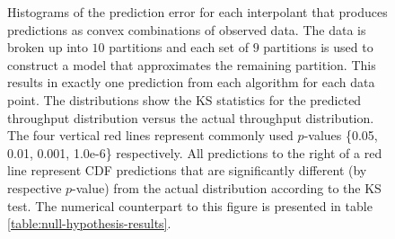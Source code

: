 \documentclass[smallextended,final]{svjour3}       %
\begin{document}
\begin{figure}
  \centering
  \caption{Histograms of the prediction error for each interpolant that produces predictions as convex combinations of observed data. The data is broken up into $10$ partitions and each set of $9$ partitions is used to construct a model that approximates the remaining partition. This results in exactly one prediction from each algorithm for each data point. The distributions show the KS statistics for the predicted throughput distribution versus the actual throughput distribution. The four vertical red lines represent commonly used $p$-values \{0.05, 0.01, 0.001, 1.0e-6\} respectively. All predictions to the right of a red line represent CDF predictions that are significantly different (by respective $p$-value) from the actual distribution according to the KS test. The numerical counterpart to this figure is presented in table \ref{table:null-hypothesis-results}.}
  \label{fig:throughput-prediction}
\end{figure}
\end{document}
